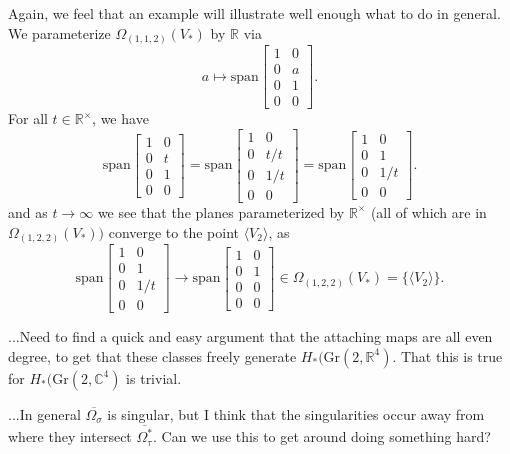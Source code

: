 \documentclass{amsart}          %
\newcommand{\Gr}{\mathrm{Gr}}
\begin{document}
Again, we feel that an example will illustrate well enough what to do in general. We parameterize $\Omega_{(1, 1, 2)}(V_{\ast})$ by $\mathbb{R}$ via
\[
a\mapsto \text{span}\begin{bmatrix}
    1 & 0 \\
    0 & a \\
    0 & 1 \\
    0 & 0
\end{bmatrix}.
\]
For all $t\in \mathbb{R}^{\times}$, we have
\[
\text{span}\begin{bmatrix}
    1 & 0 \\
    0 & t \\
    0 & 1 \\
    0 & 0
\end{bmatrix} = \text{span}\begin{bmatrix}
    1 & 0 \\
    0 & t/t \\
    0 & 1/t \\
    0 & 0
\end{bmatrix} = \text{span}\begin{bmatrix}
    1 & 0 \\
    0 & 1 \\
    0 & 1/t \\
    0 & 0
\end{bmatrix}.
\]
and as $t\to \infty$ we see that the planes parameterized by $\mathbb{R}^{\times}$ (all of which are in $\Omega_{(1, 2, 2)}(V_{\ast}))$ converge to the point $\langle V_2\rangle$, as
\[
\text{span}\begin{bmatrix}
    1 & 0 \\
    0 & 1 \\
    0 & 1/t \\
    0 & 0
\end{bmatrix} \to \text{span}\begin{bmatrix}
    1 & 0 \\
    0 & 1 \\
    0 & 0 \\
    0 & 0
\end{bmatrix} \in \Omega_{(1, 2, 2)}(V_{\ast}) = \lbrace \langle V_2 \rangle \rbrace. 
\]

...Need to find a quick and easy argument that the attaching maps are all even degree, to get that these classes freely generate $H_{\ast}(\Gr(2, \mathbb{R}^4)$. That this is true for $H_{\ast}(\Gr(2, \mathbb{C}^4)$ is trivial. 

...In general $\overline{\Omega_{\sigma}}$ is singular, but I think that the singularities occur away from where they intersect $\overline{\Omega_{\tau}^{\ast}}$. Can we use this to get around doing something hard?
\end{document}
